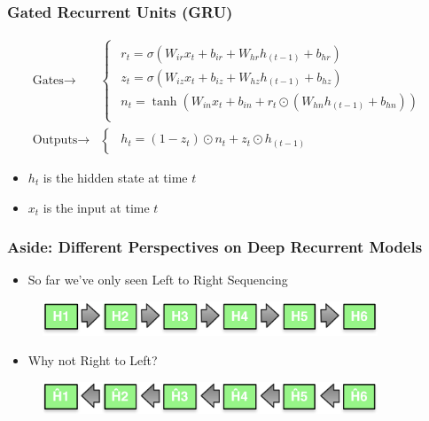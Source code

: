 \documentclass[usenames,dvipsnames]{beamer}
\begin{document}
\begin{frame}
\frametitle{Gated Recurrent Units (GRU)}
\begin{equation*}
  \begin{split}
  \text{Gates} \rightarrow & \begin{cases}
  \begin{array}{ll}
    r_t = \sigma(W_{ir} x_t + b_{ir} + W_{hr} h_{(t-1)} + b_{hr}) \\
    z_t = \sigma(W_{iz} x_t + b_{iz} + W_{hz} h_{(t-1)} + b_{hz}) \\
    n_t = \tanh(W_{in} x_t + b_{in} + r_t \odot (W_{hn} h_{(t-1)}+ b_{hn})) \\
  \end{array}
  \end{cases} \\
  \text{Outputs} \rightarrow & \begin{cases}
  \begin{array}{ll}
            h_t = (1 - z_t) \odot n_t + z_t \odot h_{(t-1)}
  \end{array}
\end{cases}
\end{split}
\end{equation*}
\begin{itemize}
  \item $h_t$ is the hidden state at time $t$
  \item $x_t$ is the input at time $t$
\end{itemize}

\end{frame}

\begin{frame}
\frametitle{Aside: Different Perspectives on Deep Recurrent Models}
  \begin{itemize}
    \item So far we've only seen Left to Right Sequencing
  \end{itemize}
  \begin{figure}
    \centering
    \includegraphics[width=10cm]{assets/L2R}
  \end{figure}
  \pause
  \begin{itemize}
    \item Why not Right to Left?
  \end{itemize}
  \begin{figure}
    \centering
    \includegraphics[width=10cm]{assets/R2L}
  \end{figure}
\end{frame}
\end{document}
